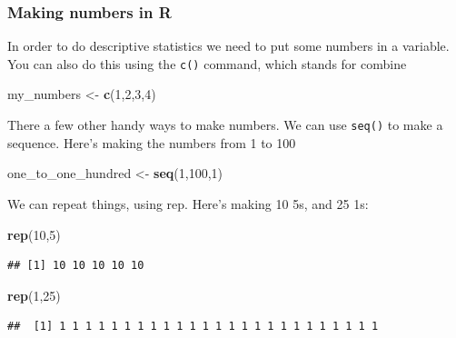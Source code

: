 \documentclass[]{book}
\newenvironment{Shaded}{\begin{snugshade}}{\end{snugshade}}
\newcommand{\KeywordTok}[1]{\textcolor[rgb]{0.13,0.29,0.53}{\textbf{{#1}}}}
\newcommand{\DecValTok}[1]{\textcolor[rgb]{0.00,0.00,0.81}{{#1}}}
\newcommand{\StringTok}[1]{\textcolor[rgb]{0.31,0.60,0.02}{{#1}}}
\newcommand{\NormalTok}[1]{{#1}}
\theoremstyle{definition}
\theoremstyle{definition}
\theoremstyle{definition}
\theoremstyle{remark}
\begin{document}
\subsubsection{Making numbers in R}\label{making-numbers-in-r}

In order to do descriptive statistics we need to put some numbers in a
variable. You can also do this using the \texttt{c()} command, which
stands for combine

\begin{Shaded}
\begin{Highlighting}[]
\NormalTok{my_numbers <-}\StringTok{ }\KeywordTok{c}\NormalTok{(}\DecValTok{1}\NormalTok{,}\DecValTok{2}\NormalTok{,}\DecValTok{3}\NormalTok{,}\DecValTok{4}\NormalTok{)}
\end{Highlighting}
\end{Shaded}

There a few other handy ways to make numbers. We can use \texttt{seq()}
to make a sequence. Here's making the numbers from 1 to 100

\begin{Shaded}
\begin{Highlighting}[]
\NormalTok{one_to_one_hundred <-}\StringTok{ }\KeywordTok{seq}\NormalTok{(}\DecValTok{1}\NormalTok{,}\DecValTok{100}\NormalTok{,}\DecValTok{1}\NormalTok{)}
\end{Highlighting}
\end{Shaded}

We can repeat things, using rep. Here's making 10 5s, and 25 1s:

\begin{Shaded}
\begin{Highlighting}[]
\KeywordTok{rep}\NormalTok{(}\DecValTok{10}\NormalTok{,}\DecValTok{5}\NormalTok{)}
\end{Highlighting}
\end{Shaded}

\begin{verbatim}
## [1] 10 10 10 10 10
\end{verbatim}

\begin{Shaded}
\begin{Highlighting}[]
\KeywordTok{rep}\NormalTok{(}\DecValTok{1}\NormalTok{,}\DecValTok{25}\NormalTok{)}
\end{Highlighting}
\end{Shaded}

\begin{verbatim}
##  [1] 1 1 1 1 1 1 1 1 1 1 1 1 1 1 1 1 1 1 1 1 1 1 1 1 1
\end{verbatim}
\end{document}
